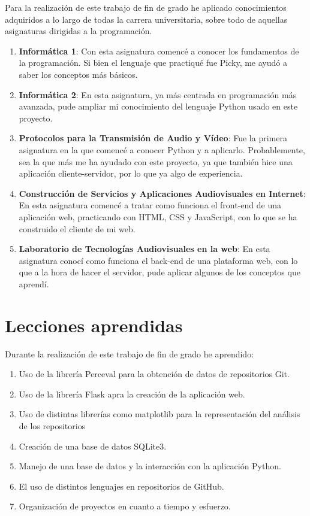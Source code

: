 \documentclass[a4paper, 12pt]{book}
\begin{document}
Para la realización de este trabajo de fin de grado he aplicado conocimientos adquiridos a lo largo de todas la carrera universitaria, sobre todo de aquellas asignaturas dirigidas a la programación.

\begin{enumerate}
  \item \textbf{Informática 1}: Con esta asignatura comencé a conocer los fundamentos de la programación. Si bien el lenguaje que practiqué fue Picky, me ayudó a saber los conceptos más básicos.
  \item \textbf{Informática 2}: En esta asignatura, ya más centrada en programación más avanzada, pude ampliar mi conocimiento del lenguaje Python usado en este proyecto.
  \item \textbf{Protocolos para la Transmisión de Audio y Vídeo}: Fue la primera asignatura en la que comencé a conocer Python y a aplicarlo. Probablemente, sea la que más me ha ayudado con este proyecto, ya que también hice una aplicación cliente-servidor, por lo que ya algo de experiencia.
  \item \textbf{Construcción de Servicios y Aplicaciones Audiovisuales en Internet}: En esta asignatura comencé a tratar como funciona el front-end de una aplicación web, practicando con HTML, CSS y JavaScript, con lo que se ha construido el cliente de mi web.
  \item \textbf{Laboratorio de Tecnologías Audiovisuales en la web}: En esta asignatura conocí como funciona el back-end de una plataforma web, con lo que a la hora de hacer el servidor, pude aplicar algunos de los conceptos que aprendí.
\end{enumerate}


\section{Lecciones aprendidas}
\label{sec:lecciones_aprendidas}

Durante la realización de este trabajo de fin de grado he aprendido:

\begin{enumerate}
  \item Uso de la librería Perceval para la obtención de datos de repositorios Git.
  \item Uso de la librería Flask apra la creación de la aplicación web.
  \item Uso de distintas librerías como matplotlib para la representación del análisis de los repositorios
  \item Creación de una base de datos SQLite3.
  \item Manejo de una base de datos y la interacción con la aplicación Python.
  \item El uso de distintos lenguajes en repositorios de GitHub.
  \item Organización de proyectos en cuanto a tiempo y esfuerzo.
\end{enumerate}
\end{document}
